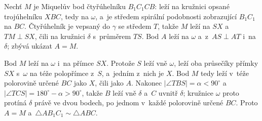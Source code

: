 {    Nechť $M$ je Miquelův bod čtyřúhelníku $B_1C_1CB$: leží na kružnici opsané trojúhelníku $XBC$, tedy na $\omega$, a~je středem spirální podobnosti zobrazující $B_1C_1$ na $BC$. Čtyřúhelník je vepsaný do $\gamma$ se středem $T$, takže $M$ leží na $SX$ a~$TM \perp SX$, čili na kružnici $\delta$ s~průměrem $TS$. Bod $A$ leží na $\omega$ a~z~$AS \perp AT$ i~na $\delta$; zbývá ukázat $A=M$.


    Bod $M$ leží na $\omega$ i~na přímce $SX$. Protože $S$ leží vně $\omega$, leží oba průsečíky přímky $SX$ s~$\omega$ na téže polopřímce z~$S$, a~jedním z~nich je $X$. Bod $M$ tedy leží v~téže polorovině určené $BC$ jako $X$, čili jako $A$. Nakonec $|\angle TBS|=\alpha<90^\circ$ a~$|\angle TCS|=180^\circ-\alpha>90^\circ$, takže $B$ leží vně $\delta$ a~$C$ uvnitř $\delta$; kružnice $\omega$ proto protíná $\delta$ právě ve dvou bodech, po jednom v~každé polorovině určené $BC$. Proto $A=M$ a~$\triangle AB_1C_1 \sim \triangle ABC$.
}

